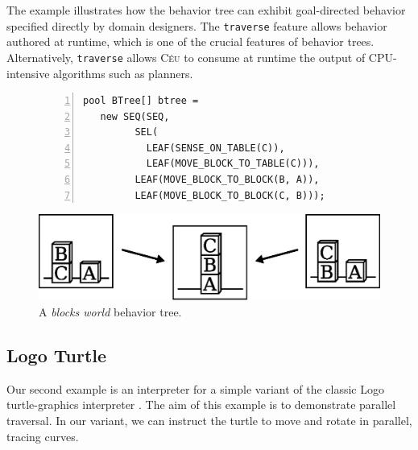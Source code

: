 \documentclass{sig-alternate}
\newcommand{\CEU}{\textsc{C\'{e}u}\xspace}
\newcommand{\code}[1] {{\small{\texttt{#1}}}}
\begin{document}
The example illustrates how the behavior tree can exhibit goal-directed 
behavior specified directly by domain designers.
The \code{traverse} feature allows behavior authored at runtime, which is one 
of the crucial features of behavior trees.
%
Alternatively, \code{traverse} allows \CEU to consume at runtime the output of 
CPU-intensive algorithms such as planners.

\begin{figure}[t]
\begin{lstlisting}[numbers=left,xleftmargin=3em]
pool BTree[] btree =
   new SEQ(SEQ,
         SEL(
           LEAF(SENSE_ON_TABLE(C)),
           LEAF(MOVE_BLOCK_TO_TABLE(C))),
         LEAF(MOVE_BLOCK_TO_BLOCK(B, A)),
         LEAF(MOVE_BLOCK_TO_BLOCK(C, B)));
\end{lstlisting}

\centerline{\includegraphics[scale=0.35]{blocksworld2.eps}}
\caption{ A \emph{blocks world} behavior tree.
\label{lst.bt1.example}
}
\end{figure}

\subsection{Logo Turtle}

Our second example is an interpreter for a simple variant of the classic Logo
turtle-graphics interpreter \cite{papert.logo}.
The aim of this example is to demonstrate parallel traversal.
In our variant, we can instruct the turtle to move and rotate in parallel, 
tracing curves.

\end{document}
